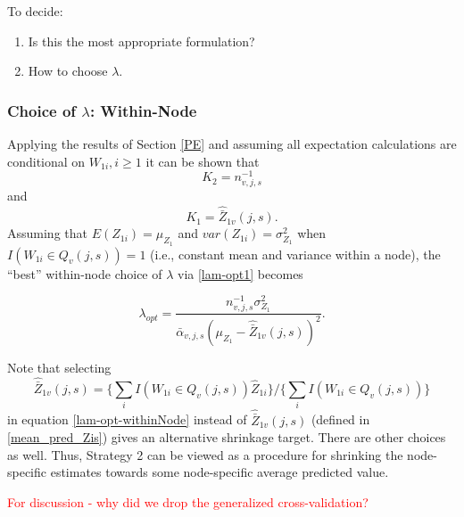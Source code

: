 \documentclass[12pt]{article}
\begin{document}
To decide: 
\begin{enumerate}
	\item Is this the most appropriate formulation? 
	\item How to choose $\lambda$.
\end{enumerate}



\subsubsection{Choice of $\lambda$: Within-Node }
Applying the results of Section \ref{PE} and assuming all expectation
calculations are conditional on $W_{1i}, i \geq 1$ it can be shown that
\[
K_2 = n^{-1}_{v,j,s}
\]
and
\[
K_1 = \hat{\bar{Z}}_{1v}(j,s).
\]
Assuming that $E(Z_{1i}) = \mu_{Z_1}$ and $var(Z_{1i}) = \sigma^2_{Z_1}$ when $I(
W_{1i} \in Q_{v}(j,s) ) =1$ (i.e., constant mean and variance within a
node), the ``best'' within-node choice of $\lambda$ via
\eqref{lam-opt1} becomes

\begin{equation}
\label{lam-opt-withinNode}
\lambda_{opt} = \frac{n^{-1}_{v,j,s} \sigma^2_{Z_1}}{ \bar{\alpha}_{v,j,s} (\mu_{Z_1} -  \hat{\bar{Z}}_{1v}(j,s))^2}.
\end{equation}

Note that selecting 
\[
\hat{\bar{Z}}_{1v}(j,s) =
\{ \sum_i I(W_{1i} \in Q_{v}(j,s))  \hat{Z}_{1i} \}
/ \{ \sum_i I(W_{1i} \in Q_{v}(j,s))  \}
\]
in equation \eqref{lam-opt-withinNode}  instead of $\hat{\bar{Z}}_{1v}(j,s)$ (defined in \eqref{mean_pred_Zis}) gives an alternative shrinkage target.  There are other choices as well. Thus, Strategy 2 can be viewed as a procedure for
shrinking the node-specific estimates towards some node-specific
average predicted value.



\textcolor{red}{For discussion - why did we drop the generalized cross-validation?}
\end{document}
